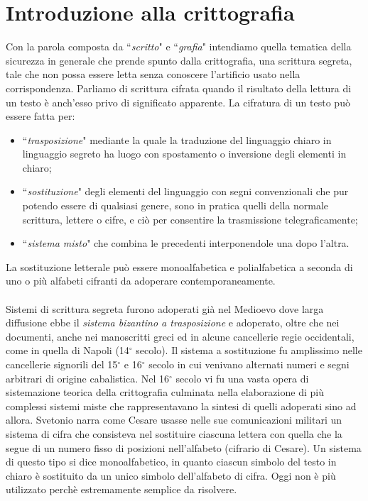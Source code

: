 \documentclass[a4paper,12pt]{tesiinfo}
\begin{document}
\maketitle
\contentspage
\chapter{Introduzione alla crittografia}
Con la parola composta da ``\textit{scritto}" e ``\textit{grafia}" intendiamo quella tematica della sicurezza in generale che prende spunto dalla crittografia, una scrittura segreta, tale che non possa essere letta senza conoscere l'artificio usato nella corrispondenza. Parliamo di scrittura cifrata quando il risultato della lettura di un testo \`e anch'esso privo di significato apparente. La cifratura di un testo pu\`o essere fatta per:
\begin{itemize}
 \item ``\textit{trasposizione}" mediante la quale la traduzione del linguaggio chiaro in linguaggio segreto ha luogo con spostamento o inversione degli elementi in chiaro;
 \item ``\textit{sostituzione}" degli elementi del linguaggio con segni convenzionali che pur potendo essere di qualsiasi genere, sono in pratica quelli della normale scrittura, lettere o cifre, e ci\`o per consentire la trasmissione telegraficamente;
 \item ``\textit{sistema misto}" che combina le precedenti interponendole una dopo l'altra.
\end{itemize} 
La sostituzione letterale pu\`o essere monoalfabetica e polialfabetica a seconda di uno o pi\`u alfabeti cifranti da adoperare contemporaneamente.
\\
\\
Sistemi di scrittura segreta furono adoperati gi\`a nel Medioevo dove larga diffusione ebbe il \textit{sistema bizantino a trasposizione} e adoperato, oltre che nei documenti, anche nei manoscritti greci ed in alcune cancellerie regie occidentali, come in quella di Napoli (14$^\circ$ secolo). Il sistema a sostituzione fu amplissimo nelle cancellerie signorili del 15$^\circ$ e 16$^\circ$ secolo in cui venivano alternati numeri e segni arbitrari di origine cabalistica. Nel 16$^\circ$ secolo vi fu una vasta opera di sistemazione teorica della crittografia culminata nella elaborazione di pi\`u complessi sistemi miste che rappresentavano la sintesi di quelli adoperati sino ad allora. 
Svetonio narra come Cesare usasse nelle sue comunicazioni militari un sistema di cifra che consisteva nel sostituire ciascuna lettera con quella che la segue di un numero fisso di posizioni nell'alfabeto (cifrario di Cesare). Un sistema di questo tipo si dice monoalfabetico, in quanto ciascun simbolo del testo in chiaro \`e sostituito da un unico simbolo dell'alfabeto di cifra. Oggi non \`e pi\`u utilizzato perch\`e estremamente semplice da risolvere.
\end{document}

